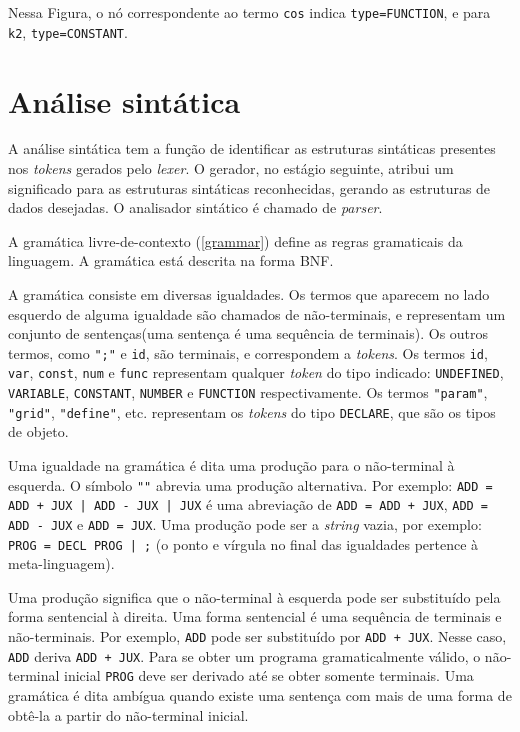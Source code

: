 Nessa Figura, o nó correspondente ao termo \texttt{cos} indica \texttt{type=FUNCTION},
e para \texttt{k2}, \texttt{type=CONSTANT}.

\section{Análise sintática}
A análise sintática tem a função de identificar as estruturas sintáticas
presentes nos \textit{tokens} gerados pelo \textit{lexer}.
O gerador, no estágio seguinte, atribui um significado para as estruturas
sintáticas reconhecidas, gerando as estruturas de dados desejadas.
O analisador sintático é chamado de \textit{parser}.

\newpage
A gramática livre-de-contexto (\ref{grammar}) define as
regras gramaticais da linguagem. A gramática está descrita na forma BNF.
\lstset{language=Octave}

A gramática consiste em diversas igualdades.
Os termos que aparecem no lado esquerdo de alguma igualdade
são chamados de não-terminais,
e representam um conjunto de sentenças(uma sentença é uma sequência de terminais).
Os outros termos, como \texttt{";"} e \texttt{id}, são terminais,
e correspondem a \textit{tokens}. Os termos \texttt{id}, \texttt{var},
\texttt{const}, \texttt{num}
e \texttt{func} representam qualquer \textit{token} do tipo indicado:
\texttt{UNDEFINED}, \texttt{VARIABLE}, \texttt{CONSTANT},
\texttt{NUMBER} e \texttt{FUNCTION} respectivamente.
Os termos \texttt{"param"}, \texttt{"grid"}, \texttt{"define"}, etc.
representam os \textit{tokens} do tipo \texttt{DECLARE}, que são os tipos de objeto.

Uma igualdade na gramática é dita uma produção para o não-terminal à esquerda.
O símbolo \texttt{"\textbar"}  abrevia uma produção alternativa. 
Por exemplo: \texttt{ADD = ADD + JUX | ADD - JUX | JUX}
é uma abreviação de \texttt{ADD = ADD + JUX},
\texttt{ADD = ADD - JUX} e \texttt{ADD = JUX}.
Uma produção pode ser a \textit{string} vazia, por exemplo: \texttt{PROG = DECL PROG | ;}
(o ponto e vírgula no final das igualdades pertence à meta-linguagem).

Uma produção significa que o não-terminal à esquerda pode ser substituído
pela forma sentencial à direita.
Uma forma sentencial é uma sequência de terminais e não-terminais.
Por exemplo, \texttt{ADD} pode ser substituído por \texttt{ADD + JUX}.
Nesse caso, \texttt{ADD} deriva \texttt{ADD + JUX}.
Para se obter um programa gramaticalmente válido,
o não-terminal inicial \texttt{PROG} deve ser derivado até se obter somente terminais.
Uma gramática é dita ambígua quando existe uma sentença com mais de uma forma de
obtê-la a partir do não-terminal inicial.

